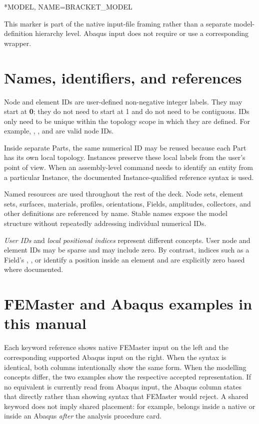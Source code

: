 \begin{syntax}
*MODEL, NAME=BRACKET_MODEL
\end{syntax}

This marker is part of the native input-file framing rather than a separate model-definition hierarchy level. Abaqus input does not require or use a corresponding wrapper.

\section{Names, identifiers, and references}

Node and element IDs are user-defined non-negative integer labels. They may start at \textbf{0}; they do not need to start at 1 and do not need to be contiguous. IDs only need to be unique within the topology scope in which they are defined. For example, , , and  are valid node IDs.

Inside separate Parts, the same numerical ID may be reused because each Part has its own local topology. Instances preserve these local labels from the user's point of view. When an assembly-level command needs to identify an entity from a particular Instance, the documented Instance-qualified reference syntax is used.

Named resources are used throughout the rest of the deck. Node sets, element sets, surfaces, materials, profiles, orientations, Fields, amplitudes, collectors, and other definitions are referenced by name. Stable names expose the model structure without repeatedly addressing individual numerical IDs.

\emph{User IDs} and \emph{local positional indices} represent different concepts. User node and element IDs may be sparse and may include zero. By contrast, indices such as a Field's , , or  identify a position inside an element and are explicitly zero based where documented.

\section{FEMaster and Abaqus examples in this manual}

Each keyword reference shows native FEMaster input on the left and the corresponding supported Abaqus input on the right. When the syntax is identical, both columns intentionally show the same form. When the modelling concepts differ, the two examples show the respective accepted representation. If no equivalent is currently read from Abaqus input, the Abaqus column states that directly rather than showing syntax that FEMaster would reject. A shared keyword does not imply shared placement: for example,  belongs inside a native  or inside an Abaqus  \emph{after} the analysis procedure card.

